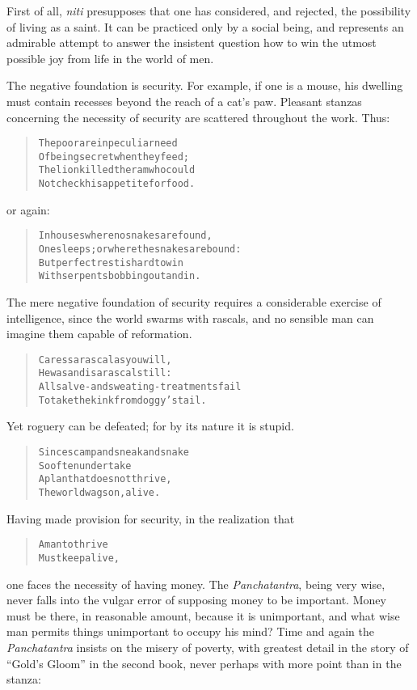 \documentclass[article, twoside, 10pt]{memoir}
\renewenvironment{verbatim}{%
\begin{quote}%
\vskip -10pt%
\begin{alltt}\normalfont\small}{\end{alltt}%
\end{quote}%
\vskip -10pt
} %
\begin{document}
First of all, \emph{niti} presupposes that one has considered, and
rejected, the possibility of living as a saint. It can be practiced
only by a social being, and represents an admirable attempt to
answer the insistent question how to win the utmost possible joy
from life in the world of men.

The negative foundation is security. For example, if one is a
mouse, his dwelling must contain recesses beyond the reach of a
cat's paw. Pleasant stanzas concerning the necessity of security
are scattered throughout the work. Thus:

\begin{verbatim}
The poor are in peculiar need
Of being secret when they feed;
The lion killed the ram who could
Not check his appetite for food.
\end{verbatim}
or again:

\begin{verbatim}
In houses where no snakes are found,
One sleeps; or where the snakes are bound:
But perfect rest is hard to win
With serpents bobbing out and in.
\end{verbatim}
The mere negative foundation of security requires a considerable
exercise of intelligence, since the world swarms with rascals, and
no sensible man can imagine them capable of reformation.

\begin{verbatim}
Caress a rascal as you will,
He was and is a rascal still:
All salve- and sweating-treatments fail
To take the kink from doggy's tail.
\end{verbatim}
Yet roguery can be defeated; for by its nature it is stupid.

\begin{verbatim}
Since scamp and sneak and snake
So often undertake
A plan that does not thrive,
The world wags on, alive.
\end{verbatim}
Having made provision for security, in the realization that

\begin{verbatim}
A man to thrive
Must keep alive,
\end{verbatim}
one faces the necessity of having money. The \emph{Panchatantra},
being very wise, never falls into the vulgar error of supposing
money to be important. Money must be there, in reasonable amount,
because it is unimportant, and what wise man permits things
unimportant to occupy his mind? Time and again the
\emph{Panchatantra} insists on the misery of poverty, with greatest
detail in the story of ``Gold's Gloom'' in the second book, never
perhaps with more point than in the stanza:
\end{document}
